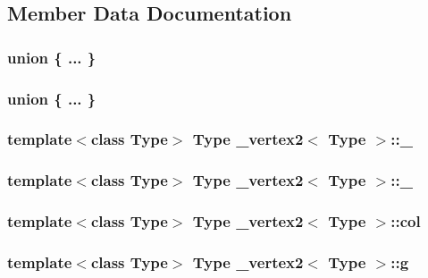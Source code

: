 \subsection{Member Data Documentation}
\hypertarget{class__vertex2_af41de4f01565ae1825909a8b8d1a9c75}{\subsubsection[{"@1}]{\setlength{\rightskip}{0pt plus 5cm}union \{ ... \} }}\label{class__vertex2_af41de4f01565ae1825909a8b8d1a9c75}
\hypertarget{class__vertex2_a0337e24bb2631d3de2e6fc12dcc9c5b0}{\subsubsection[{"@3}]{\setlength{\rightskip}{0pt plus 5cm}union \{ ... \} }}\label{class__vertex2_a0337e24bb2631d3de2e6fc12dcc9c5b0}
\hypertarget{class__vertex2_aba4452e10ea646649c3fd6c9cec1c89e}{
\subsubsection[{\+\_\+0}]{\setlength{\rightskip}{0pt plus 5cm}template$<$class Type$>$ Type {\bf \+\_\+vertex2}$<$ Type $>$\+::\+\_}}\label{class__vertex2_aba4452e10ea646649c3fd6c9cec1c89e}
\hypertarget{class__vertex2_a2f4d1d0369130356ebdf797b6da78bb8}{
\subsubsection[{\+\_\+1}]{\setlength{\rightskip}{0pt plus 5cm}template$<$class Type$>$ Type {\bf \+\_\+vertex2}$<$ Type $>$\+::\+\_}}\label{class__vertex2_a2f4d1d0369130356ebdf797b6da78bb8}
\hypertarget{class__vertex2_a522c14fc32a2228789325db485217eeb}{
\subsubsection[{col}]{\setlength{\rightskip}{0pt plus 5cm}template$<$class Type$>$ Type {\bf \+\_\+vertex2}$<$ Type $>$\+::col}}\label{class__vertex2_a522c14fc32a2228789325db485217eeb}
\hypertarget{class__vertex2_aefb25eeec2261091016c3cfe508fdaaa}{
\subsubsection[{g}]{\setlength{\rightskip}{0pt plus 5cm}template$<$class Type$>$ Type {\bf \+\_\+vertex2}$<$ Type $>$\+::g}}\label{class__vertex2_aefb25eeec2261091016c3cfe508fdaaa}
